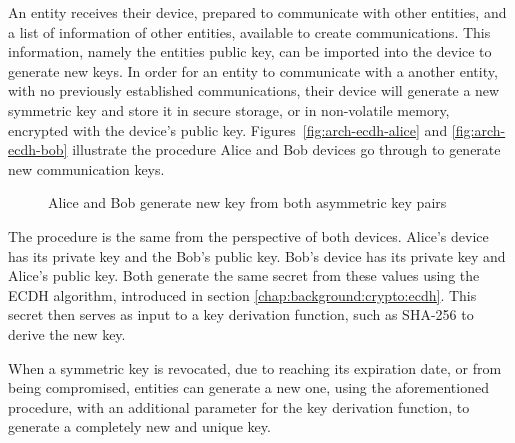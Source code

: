 An entity receives their device, prepared to communicate with other entities, and a list of information of other entities, available to create communications. This information, namely the entities public key, can be imported into the device to generate new keys.
In order for an entity to communicate with a another entity, with no previously established communications, their device will generate a new symmetric key and store it in secure storage, or in non-volatile memory, encrypted with the device's public key.
Figures~\ref{fig:arch-ecdh-alice} and \ref{fig:arch-ecdh-bob} illustrate the procedure Alice and Bob devices go through to generate new communication keys.

\begin{figure}[h]
	\centering     %
	\caption{Alice and Bob generate new key from both asymmetric key pairs}
\end{figure}

The procedure is the same from the perspective of both devices. Alice's device has its private key and the Bob's public key. Bob's device has its private key and Alice's public key. Both generate the same secret from these values using the \ac{ECDH} algorithm, introduced in section \ref{chap:background:crypto:ecdh}.
This secret then serves as input to a key derivation function, such as SHA-256 to derive the new key.


When a symmetric key is revocated, due to reaching its expiration date, or from being compromised, entities can generate a new one, using the aforementioned procedure, with an additional parameter for the key derivation function, to generate a completely new and unique key.
